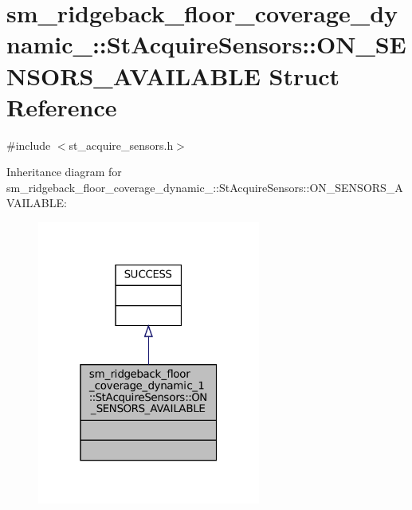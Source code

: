 \hypertarget{structsm__ridgeback__floor__coverage__dynamic__1_1_1StAcquireSensors_1_1ON__SENSORS__AVAILABLE}{}\section{sm\+\_\+ridgeback\+\_\+floor\+\_\+coverage\+\_\+dynamic\+\_\+:\+:St\+Acquire\+Sensors\+:\+:O\+N\+\_\+\+S\+E\+N\+S\+O\+R\+S\+\_\+\+A\+V\+A\+I\+L\+A\+B\+LE Struct Reference}
\label{structsm__ridgeback__floor__coverage__dynamic__1_1_1StAcquireSensors_1_1ON__SENSORS__AVAILABLE}


{\ttfamily \#include $<$st\+\_\+acquire\+\_\+sensors.\+h$>$}



Inheritance diagram for sm\+\_\+ridgeback\+\_\+floor\+\_\+coverage\+\_\+dynamic\+\_\+:\+:St\+Acquire\+Sensors\+:\+:O\+N\+\_\+\+S\+E\+N\+S\+O\+R\+S\+\_\+\+A\+V\+A\+I\+L\+A\+B\+LE\+:
\nopagebreak
\begin{figure}[H]
\begin{center}
\leavevmode
\includegraphics[width=208pt]{structsm__ridgeback__floor__coverage__dynamic__1_1_1StAcquireSensors_1_1ON__SENSORS__AVAILABLE__inherit__graph}
\end{center}
\end{figure}


